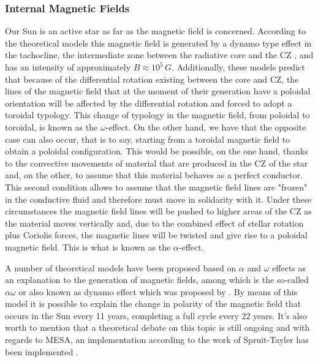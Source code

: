 \documentclass[fleqn,usenatbib]{mnras}
\begin{document}
\subsubsection{Internal Magnetic Fields}
Our Sun is an active star as far as the magnetic field is concerned. According to the theoretical models this magnetic field is generated by a dynamo type effect in the tachocline, the intermediate zone between the radiative core and the CZ \citep{Aschwanden2014}, and has an intensity of approximately $B\approx10^5\, G$. Additionally, these models predict that because of the differential rotation existing between the core and CZ, the lines of the magnetic field that at the moment of their generation have a poloidal orientation will be affected by the differential rotation and forced to adopt a toroidal typology. This change of typology in the magnetic field, from poloidal to toroidal, is known as the $\omega$-effect. On the other hand, we have that the opposite case can also occur, that is to say, starting from a toroidal magnetic field to obtain a poloidal configuration. This would be possible, on the one hand, thanks to the convective movements of material that are produced in the CZ of the star and, on the other, to assume that this material behaves as a perfect conductor. This second condition allows to assume that the magnetic field lines are "frozen" in the conductive fluid and therefore must move in solidarity with it. Under these circumstances the magnetic field lines will be pushed to higher areas of the CZ as the material moves vertically and, due to the combined effect of stellar rotation plus Coriolis forces, the magnetic lines will be twisted and give rise to a poloidal magnetic field. This is what is known as the $\alpha$-effect.\par

A number of theoretical models have been proposed based on $\alpha$ and $\omega$ effects as an explanation to the generation of magnetic fields, among which is the so-called $\alpha\omega$ or also known as dynamo effect which was proposed by \citet{Spruit2002}. By means of this model it is possible to explain the change in polarity of the magnetic field that occurs in the Sun every 11 years, completing a full cycle every 22 years. It's also worth to mention that a theoretical debate on this topic is still ongoing \citep{Denissenkov2007} and with regards to MESA, an implementation according to the work of Spruit-Tayler has been implemented \citep{Paxton2013}.\par
\end{document}
